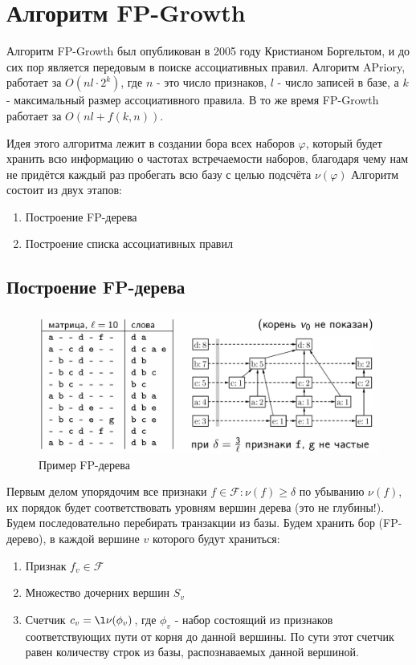 \section{Алгоритм FP-Growth}
Алгоритм FP-Growth был опубликован в 2005 году Кристианом Боргельтом, и до сих пор является передовым в поиске ассоциативных правил. Алгоритм APriory, работает за $O(nl\cdot 2^k)$, где $n$ - это число признаков, $l$ - число записей в базе, а $k$ - максимальный размер ассоциативного правила. В то же время FP-Growth работает за $O(nl + f(k, n))$.

Идея этого алгоритма лежит в создании бора всех наборов $\varphi$, который будет хранить всю информацию о частотах встречаемости наборов, благодаря чему нам не придётся каждый раз пробегать всю базу с целью подсчёта $\nu(\varphi)$
\newline\newline
Алгоритм состоит из двух этапов:
\begin{enumerate}
    \item Построение FP-дерева
    \item Построение списка ассоциативных правил
\end{enumerate}

\subsection{Построение FP-дерева}

\begin{figure}[h]
    \centering
    \includegraphics[width=0.8\linewidth]{chapters/rules/images/fp-tree-example.png}
    \caption{Пример FP-дерева}
\end{figure}

Первым делом упорядочим все признаки $f \in \mathcal{F}: \nu(f) \geq \delta$ по убыванию $\nu(f)$, их порядок будет соответствовать уровням вершин дерева (это не глубины!). Будем последовательно перебирать транзакции из базы. Будем хранить бор (FP-дерево), в каждой вершине $v$ которого будут храниться: 
\begin{enumerate}
    \item Признак $f_v \in \mathcal{F}$
    \item Множество дочерних вершин $S_v$
    \item Счетчик $c_v = \l\nu(\phi_v)$, где $\phi_v$ - набор состоящий из признаков соответствующих пути от корня до данной вершины. По сути этот счетчик равен количеству строк из базы, распознаваемых данной вершиной.
\end{enumerate}

